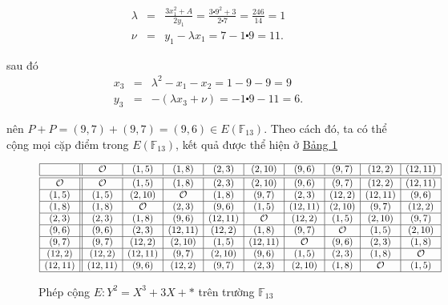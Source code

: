 $$
	\begin{array}{rcl}
		\lambda & = & \frac{3x_1^2+A}{2y_1} = \frac{3\centerdot 9^ 2 + 3}{2 \centerdot 7} = \frac{246}{14} = 1 \\
		\nu     & = & y_1-\lambda x_1 = 7 - 1 \centerdot 9 = 11 .
	\end{array}
$$

sau đó
$$
	\begin{array}{rcl}
		x_3 & = & \lambda^2 - x_1 - x_2 = 1 - 9 - 9 = 9          \\
		y_3 & = & -(\lambda x_3 + \nu) = -1 \centerdot 9 -11 =6.
	\end{array}
$$

nên $P+P = (9,7) + (9,7) = (9,6) \in E(\mathbb{F}_{13})$. Theo cách đó, ta có thể cộng mọi cặp điểm trong $E(\mathbb{F}_{13})$, kết quả được thể hiện ở \hyperref[fg:tb1]{Bảng 1}


\begin{figure}[H]
	\label{fg:tb1}
	\caption{Phép cộng $E: Y^2 = X^3 + 3X + *$ trên trường $\mathbb{F}_{13}$}
	$
		\begin{array}{|c||c|c|c|c|c|c|c|c|c|}
			\hline
			            & \mathcal{O} & (1,5)       & (1,8)       & (2,3)   & (2,10)      & (9,6)       & (9,7)       & (12,2)      & (12,11)     \\
			\hline
			\hline
			\mathcal{O} & \mathcal{O} & (1,5)       & (1,8)       & (2,3)   & (2,10)      & (9,6)       & (9,7)       & (12,2)      & (12,11)     \\
			\hline
			(1,5)       & (1,5)       & (2,10)      & \mathcal{O} & (1,8)   & (9,7)       & (2,3)       & (12,2)      & (12,11)     & (9,6)       \\
			\hline
			(1,8)       & (1,8)       & \mathcal{O} & (2,3)       & (9,6)   & (1,5)       & (12,11)     & (2,10)      & (9,7)       & (12,2)      \\
			\hline
			(2,3)       & (2,3)       & (1,8)       & (9,6)       & (12,11) & \mathcal{O} & (12,2)      & (1,5)       & (2,10)      & (9,7)       \\
			\hline
			(9,6)       & (9,6)       & (2,3)       & (12,11)     & (12,2)  & (1,8)       & (9,7)       & \mathcal{O} & (1,5)       & (2,10)      \\
			\hline
			(9,7)       & (9,7)       & (12,2)      & (2,10)      & (1,5)   & (12,11)     & \mathcal{O} & (9,6)       & (2,3)       & (1,8)       \\
			\hline
			(12,2)      & (12,2)      & (12,11)     & (9,7)       & (2,10)  & (9,6)       & (1,5)       & (2,3)       & (1,8)       & \mathcal{O} \\
			\hline
			(12,11)     & (12,11)     & (9,6)       & (12,2)      & (9,7)   & (2,3)       & (2,10)      & (1,8)       & \mathcal{O} & (1,5)       \\
			\hline
		\end{array}
	$
\end{figure}


